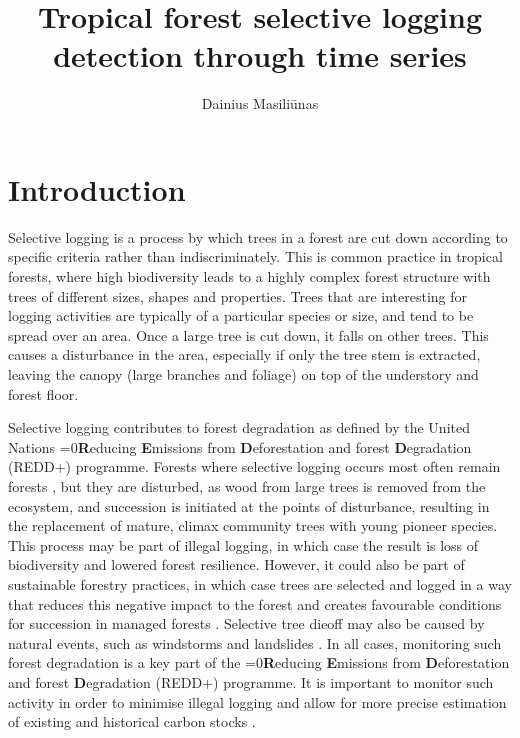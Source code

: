 \documentclass[a4paper,10pt]{article}
\title{Tropical forest selective logging detection through time series}
\author{Dainius Masiliūnas}
\newcommand{\underletter}[1]{\textbf{#1}} %
\newcounter{reddcount}
\newcommand{\redd}{\ifnum\value{reddcount}=0{\underletter{R}educing \underletter{E}missions from \underletter{D}eforestation and forest \underletter{D}egradation (REDD+)}\else{REDD+}\fi\stepcounter{reddcount}}
\begin{document}
\maketitle

\section{Introduction}

Selective logging is a process by which trees in a forest are cut down according to specific criteria rather than indiscriminately. This is common practice in tropical forests, where high biodiversity leads to a highly complex forest structure with trees of different sizes, shapes and properties. Trees that are interesting for logging activities are typically of a particular species or size, and tend to be spread over an area. Once a large tree is cut down, it falls on other trees. This causes a disturbance in the area, especially if only the tree stem is extracted, leaving the canopy (large branches and foliage) on top of the understory and forest floor.

Selective logging contributes to forest degradation as defined by the United Nations \redd{} programme. Forests where selective logging occurs most often remain forests \citep{asner_condition_2006}, but they are disturbed, as wood from large trees is removed from the ecosystem, and succession is initiated at the points of disturbance, resulting in the replacement of mature, climax community trees with young pioneer species. This process may be part of illegal logging, in which case the result is loss of biodiversity and lowered forest resilience. However, it could also be part of sustainable forestry practices, in which case trees are selected and logged in a way that reduces this negative impact to the forest and creates favourable conditions for succession in managed forests \citep{west_forest_2014, keller_4._2004}. Selective tree dieoff may also be caused by natural events, such as windstorms and landslides \citep{frolking_forest_2009}. In all cases, monitoring such forest degradation is a key part of the \redd{} programme. It is important to monitor such activity in order to minimise illegal logging and allow for more precise estimation of existing and historical carbon stocks \citep{piponiot_carbon_2016, pinard_simulated_2000}.
\end{document}
